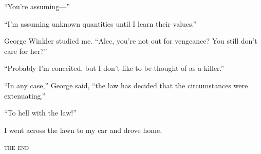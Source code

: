 {“You’re assuming—”

“I’m assuming unknown quantities until I learn their values.”

George Winkler studied me. “Alec, you’re not out for vengeance? You still don’t care for her?”

“Probably I’m conceited, but I don’t like to be thought of as a killer.”

“In any case,” George said, “the law has decided that the circumstances were extenuating.”

“To hell with the law!”

I went across the lawn to my car and drove home.

}

\vspace{2\nbs}
\clearpage
\thispagestyle{empty}


\scenebreak
\scenebreak
{\centering\textsc{the end}\par}

\clearpage
